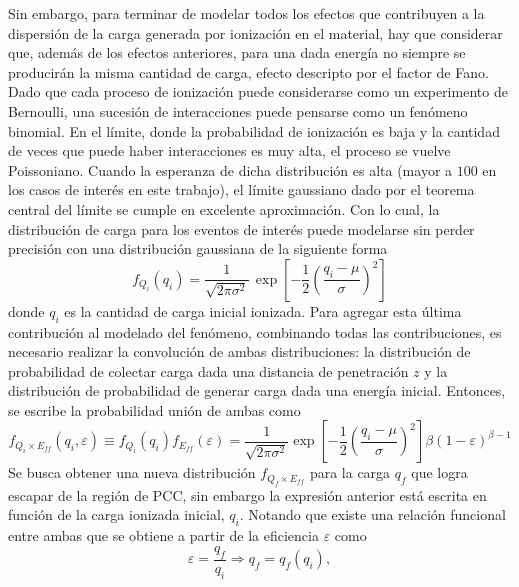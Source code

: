 Sin embargo, para terminar de modelar todos los efectos que contribuyen a la dispersión de la carga generada por ionización en el material, hay que considerar que, además de los efectos anteriores, para una dada energía no siempre se producirán la misma cantidad de carga, efecto descripto por el factor de Fano. Dado que cada proceso de ionización puede considerarse como un experimento de Bernoulli, una sucesión de interacciones puede pensarse como un fenómeno binomial. En el límite, donde la probabilidad de ionización es baja y la cantidad de veces que puede haber interacciones es muy alta, el proceso se vuelve Poissoniano. Cuando la esperanza de dicha distribución es alta (mayor a $100$ en los casos de interés en este trabajo), el límite gaussiano dado por el teorema central del límite se cumple en excelente aproximación. Con lo cual, la distribución de carga para los eventos de interés puede modelarse sin perder precisión con una distribución gaussiana de la siguiente forma
\begin{equation*}
    f_{Q_{i}}(q_{i}) = 
    \frac{1}{\sqrt{2\pi \sigma^{2}}}\,
    \exp
        \left[
            -\frac{1}{2}
            \left(
                \frac{q_{i} - \mu}{\sigma}
            \right)^{2}
        \right]
\end{equation*}
donde $q_{i}$ es la cantidad de carga inicial ionizada. Para agregar esta última contribución al modelado del fenómeno, combinando todas las contribuciones, es necesario realizar la convolución de ambas distribuciones: la distribución de probabilidad de colectar carga dada una distancia de penetración $z$ y la distribución de probabilidad de generar carga dada una energía inicial. Entonces, se escribe la probabilidad unión de ambas como
\begin{equation*}
    f_{Q_{i} \times E_{ff}} (q_{i}, \varepsilon)
    \equiv f_{Q_{i}}(q_{i}) f_{E_{ff}}(\varepsilon)
    =
    \frac{1}{\sqrt{2\pi \sigma^{2}}}
    \exp
        \left[
            -\frac{1}{2}
            \left(
                \frac{q_{i} - \mu}{\sigma}
            \right)^{2}
        \right]
    \beta(1-\varepsilon)^{\beta - 1}
\end{equation*}
Se busca obtener una nueva distribución $f_{Q_{f}\times E_{ff}}$ para la carga $q_{f}$ que logra escapar de la región de PCC, sin embargo la expresión anterior está escrita en función de la carga ionizada inicial, $q_{i}$. Notando que existe una relación funcional entre ambas que se obtiene a partir de la eficiencia $\varepsilon$ como
\begin{equation*}
    \varepsilon = \frac{q_{f}}{q_{i}}
    \Longrightarrow
    q_{f} = q_{f}(q_{i}),
\end{equation*}
